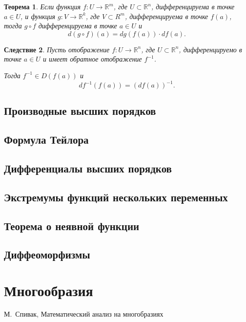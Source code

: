 \documentclass[oneside, final]{book}
\newcommand{\mbb}[1]{\mathbb{#1}}
\theoremstyle{plain}
\newtheorem{theorem}{Теорема}[chapter]
\newtheorem{corollary}[theorem]{Следствие}
\theoremstyle{definition}
\begin{document}
	\begin{theorem}
		Если функция $f\colon U \to \mbb R^m$, где $U \subset \mbb R^n$, дифференцируема в точке $a\in U$, и функция $g \colon V \to \mbb R^k$, где $V \subset R^m$, дифференцируема в точке $f(a)$, тогда
		$g \circ f$ дифференцируема в точке $a \in U$ и 
		$$
			d(g \circ f)(a) = dg(f(a))\cdot df(a).
		$$
	\end{theorem}
	\begin{corollary}
		Пусть отображение $f\colon U \to \mbb R^n$, где $U \subset \mbb R^n$, дифференцируемо в точке $a\in U$ и  имеет обратное отображение $f^{-1}$.
		
		Тогда $f^{-1} \in D(f(a))$ и 
		$$
			df^{-1}(f(a)) = (df(a))^{-1}.
		$$
	\end{corollary}
	
	
	\section{Производные высших порядков}
	
	\section{Формула Тейлора}

	\section{Дифференциалы высших порядков}
	
	\section{Экстремумы функций нескольких переменных}
	
	\section{Теорема о неявной функции}
	
	\section{Диффеоморфизмы} 
		
	\chapter{Многообразия}
	
	\begin{thebibliography}{0}
		 М.~Спивак, Математический анализ на многобразиях
	\end{thebibliography}
\end{document}
